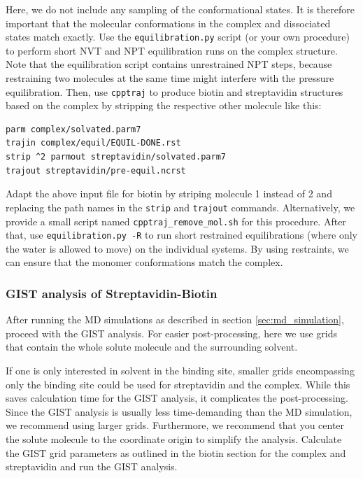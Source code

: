 \documentclass[9pt,tutorial]{livecoms}
\newcommand{\software}{\texttt}
\newcommand\inlinecode{\texttt}
\begin{document}
Here, we do not include any sampling of the conformational states.
It is therefore important that the molecular conformations in the complex and dissociated states match exactly.
Use the \software{equilibration.py} script (or your own procedure) to perform short NVT and NPT equilibration runs on the complex structure.
Note that the equilibration script contains unrestrained NPT steps, because restraining two molecules at the same time might interfere with the pressure equilibration.
Then, use \software{cpptraj} to produce biotin and streptavidin structures based on the complex by stripping the respective other molecule like this:
\begin{lstlisting}[style=cpptraj]
parm complex/solvated.parm7
trajin complex/equil/EQUIL-DONE.rst
strip ^2 parmout streptavidin/solvated.parm7
trajout streptavidin/pre-equil.ncrst
\end{lstlisting}
Adapt the above input file for biotin by striping molecule 1 instead of 2 and replacing the path names in the \inlinecode{strip} and  \inlinecode{trajout} commands.
Alternatively, we provide a small script named \software{cpptraj\_remove\_mol.sh} for this procedure.
After that, use \software{equilibration.py -R} to run short restrained 
equilibrations (where only the water is allowed to move) on the individual 
systems.
By using restraints, we can ensure that the monomer conformations match the complex.

\subsubsection{GIST analysis of Streptavidin-Biotin}

After running the MD simulations as described in section \ref{sec:md_simulation}, proceed with the GIST analysis.
For easier post-processing, here we use grids that contain the whole solute molecule and the surrounding solvent.

If one is only interested in solvent in the binding site, smaller grids encompassing only the binding site could be used for streptavidin and the complex. While this saves calculation time for the GIST analysis, it complicates the post-processing. Since the GIST analysis is usually less time-demanding than the MD simulation, we recommend using larger grids.
Furthermore, we recommend that you center the solute molecule to the coordinate origin to simplify the analysis.
Calculate the GIST grid parameters as outlined in the biotin section for the complex and streptavidin and run the GIST analysis.
\end{document}
